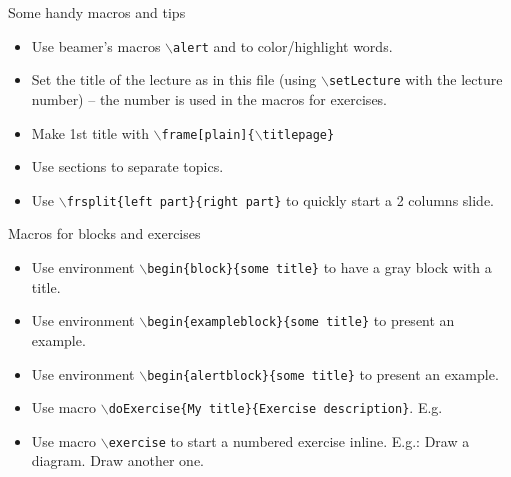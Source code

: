 \documentclass[aspectratio=169]{beamer}
\begin{document}
\begin{slide}{Some handy macros and tips}
  \begin{itemize}
    \item Use beamer's macros \alert{\texttt{$\backslash$alert}} and  to color/highlight words.

    \item{Set the title of the lecture as in this file (using \alert{\texttt{$\backslash$setLecture}} with the lecture number) -- the number is used in the macros for exercises.}

		\item Make 1st title with \alert{\texttt{$\backslash$frame[plain]\{$\backslash$titlepage\}}}

		\item Use sections to separate topics.

    \item Use \alert{\texttt{$\backslash$frsplit\{left part\}\{right part\}}} to quickly start a 2 columns slide.
  \end{itemize}
\end{slide}

\begin{slide}{Macros for blocks and exercises}
	\begin{itemize}
    \item Use environment \alert{\texttt{$\backslash$begin\{block\}\{some title\}}} to have a gray block with a title.

    \item Use environment \alert{\texttt{$\backslash$begin\{exampleblock\}\{some title\}}} to present an example.

    \item Use environment \alert{\texttt{$\backslash$begin\{alertblock\}\{some title\}}} to present an example.

    \item Use macro \alert{\texttt{$\backslash$doExercise\{My title\}\{Exercise description\}}}.
    E.g.

    \item Use macro \alert{\texttt{$\backslash$exercise}} to start a numbered exercise inline.
    E.g.: \exercise Draw a diagram. \exercise Draw another one.

  \end{itemize}
  
\end{slide}
\end{document}
